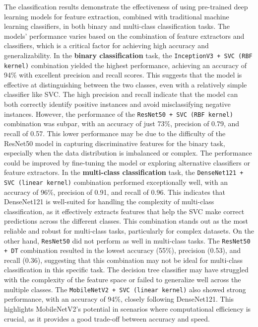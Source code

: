 \documentclass[12pt,a4paper]{report}
\begin{document}
\hspace{1cm}The classification results demonstrate the effectiveness of using pre-trained deep learning models for feature extraction, combined with traditional machine learning classifiers, in both binary and multi-class classification tasks. The models' performance varies based on the combination of feature extractors and classifiers, which is a critical factor for achieving high accuracy and generalizability. In the \textbf{binary classification} task, the \texttt{InceptionV3 + SVC (RBF kernel)} combination yielded the highest performance, achieving an accuracy of 94\% with excellent precision and recall scores. This suggests that the model is effective at distinguishing between the two classes, even with a relatively simple classifier like SVC. The high precision and recall indicate that the model can both correctly identify positive instances and avoid misclassifying negative instances. However, the performance of the \texttt{ResNet50 + SVC (RBF kernel)} combination was subpar, with an accuracy of just 73\%, precision of 0.79, and recall of 0.57. This lower performance may be due to the difficulty of the ResNet50 model in capturing discriminative features for the binary task, especially when the data distribution is imbalanced or complex. The performance could be improved by fine-tuning the model or exploring alternative classifiers or feature extractors. In the \textbf{multi-class classification} task, the \texttt{DenseNet121 + SVC (linear kernel)} combination performed exceptionally well, with an accuracy of 96\%, precision of 0.91, and recall of 0.96. This indicates that DenseNet121 is well-suited for handling the complexity of multi-class classification, as it effectively extracts features that help the SVC make correct predictions across the different classes. This combination stands out as the most reliable and robust for multi-class tasks, particularly for complex datasets.  On the other hand, \texttt{ResNet50} did not perform as well in multi-class tasks. The \texttt{ResNet50 + DT} combination resulted in the lowest accuracy (55\%), precision (0.53), and recall (0.36), suggesting that this combination may not be ideal for multi-class classification in this specific task. The decision tree classifier may have struggled with the complexity of the feature space or failed to generalize well across the multiple classes. The \texttt{MobileNetV2 + SVC (linear kernel)} also showed strong performance, with an accuracy of 94\%, closely following DenseNet121. This highlights MobileNetV2's potential in scenarios where computational efficiency is crucial, as it provides a good trade-off between accuracy and speed.
\end{document}

